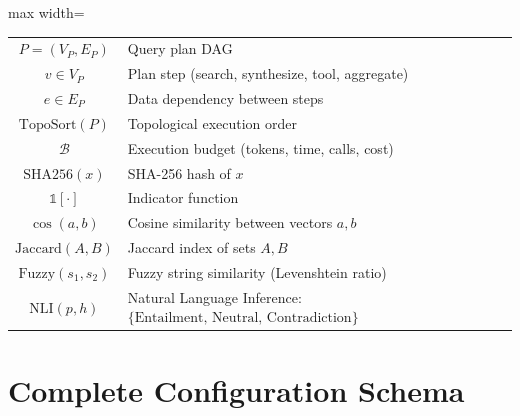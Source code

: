 \begin{table}[htbp]
\begin{adjustbox}{max width=\textwidth}
\begin{tabular}{cl}
$P = (V_P, E_P)$ & Query plan DAG \\
$v \in V_P$ & Plan step (search, synthesize, tool, aggregate) \\
$e \in E_P$ & Data dependency between steps \\
$\text{TopoSort}(P)$ & Topological execution order \\
$\mathcal{B}$ & Execution budget (tokens, time, calls, cost) \\
$\text{SHA256}(x)$ & SHA-256 hash of $x$ \\
$\mathbb{1}[\cdot]$ & Indicator function \\
$\cos(a, b)$ & Cosine similarity between vectors $a, b$ \\
$\text{Jaccard}(A, B)$ & Jaccard index of sets $A, B$ \\
$\text{Fuzzy}(s_1, s_2)$ & Fuzzy string similarity (Levenshtein ratio) \\
$\text{NLI}(p, h)$ & Natural Language Inference: $\{\text{Entailment, Neutral, Contradiction}\}$ \\
\bottomrule
\end{tabular}
\end{adjustbox}
\end{table}


\section{Complete Configuration Schema}
\label{app:config}


